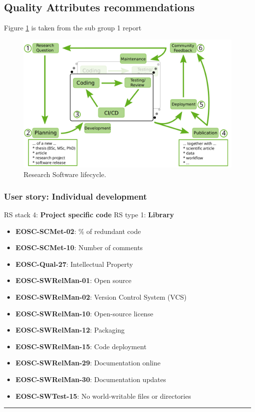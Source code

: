 \subsection{Quality Attributes recommendations}

Figure \ref{fig:rslifecycle} is taken from the sub group 1 report \cite{sg1tf2023}

\begin{figure}[h]
    \centering
    \includegraphics[width=0.99\linewidth]{imgs/rs_lifecycle.png}
    \caption{Research Software lifecycle.}
    \label{fig:rslifecycle}
\end{figure}



\subsubsection{User story: Individual development}

RS stack 4: \textbf{Project specific code} \newline
RS type 1: \textbf{Library}

\begin{itemize}
    \item \textbf{EOSC-SCMet-02}: \% of redundant code
    \item \textbf{EOSC-SCMet-10}: Number of comments
    \item \textbf{EOSC-Qual-27}: Intellectual Property
    \item \textbf{EOSC-SWRelMan-01}: Open source
    \item \textbf{EOSC-SWRelMan-02}: Version Control System (VCS)
    \item \textbf{EOSC-SWRelMan-10}: Open-source license
    \item \textbf{EOSC-SWRelMan-12}: Packaging
    \item \textbf{EOSC-SWRelMan-15}: Code deployment
    \item \textbf{EOSC-SWRelMan-29}: Documentation online
    \item \textbf{EOSC-SWRelMan-30}: Documentation updates
    \item \textbf{EOSC-SWTest-15}: No world-writable files or directories
\end{itemize}
\hrule

